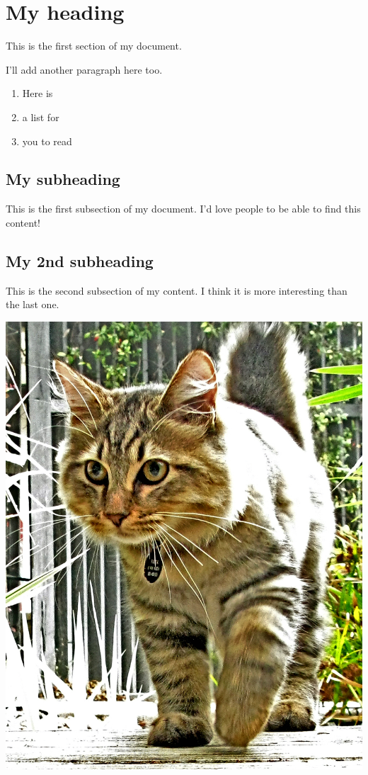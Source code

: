\documentclass{article}
\begin{document}
\section{My heading}\label{my-heading}

This is the first section of my document.

I'll add another paragraph here too.

\begin{enumerate}
\item
  Here is
\item
  a list for
\item
  you to read
\end{enumerate}

\subsection{My subheading}

This is the first subsection of my document. I'd love people to be able
to find this content!

\subsection*{My 2nd subheading}

This is the second subsection of my content. I think it is more
interesting than the last one.

\includegraphics[width=.8\textwidth]{../form/cat1.jpg}
\end{document}
